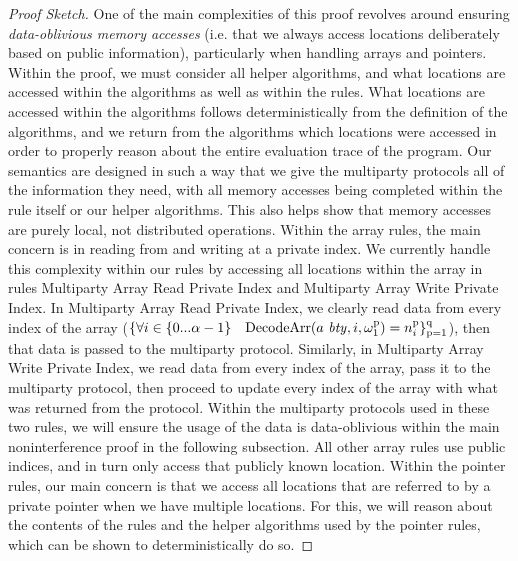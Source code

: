 \begin{proof}[Proof Sketch]
One of the main complexities of this proof revolves around ensuring \emph{data-oblivious memory accesses} (i.e. that we always access locations deliberately based on public information), particularly when handling arrays and pointers. Within the proof, we must consider all helper algorithms, and what locations are accessed within the algorithms as well as within the rules. What locations are accessed within the algorithms follows deterministically from the definition of the algorithms, and we return from the algorithms which locations were accessed in order to properly reason about the entire evaluation trace of the program. Our semantics are designed in such a way that we give the multiparty protocols all of the information they need, with all memory accesses being completed within the rule itself or our helper algorithms. This also helps show that memory accesses are purely local, not distributed operations.  
%
Within the array rules, the main concern is in reading from and writing at a private index. We currently handle this complexity within our rules by accessing all locations within the array in rules Multiparty Array Read Private Index and Multiparty Array Write Private Index. 
In Multiparty Array Read Private Index, we clearly read data from every index of the array ($\{\forall i \in \{0...\alpha-1\} \quad \mathrm{DecodeArr}({a\ \mathit{bty}}, i, {\omega^{\mathrm{{p}}}_1}) =  n^{\mathrm{{p}}}_i\}^{\mathrm{{q}}}_{\mathrm{{p}} = \mathrm{{1}}}$), then that data is passed to the multiparty protocol. 
Similarly, in Multiparty Array Write Private Index, we read data from every index of the array, pass it to the multiparty protocol, then proceed to update every index of the array with what was returned from the protocol. 
Within the multiparty protocols used in these two rules, we will ensure the usage of the data is data-oblivious within the main noninterference proof in the following subsection. 
All other array rules use public indices, and in turn only access that publicly known location.
Within the pointer rules, our main concern is that we access all locations that are referred to by a private pointer when we have multiple locations. For this, we will reason about the contents of the rules and the helper algorithms used by the pointer rules, which can be shown to deterministically do so.
\end{proof}




















